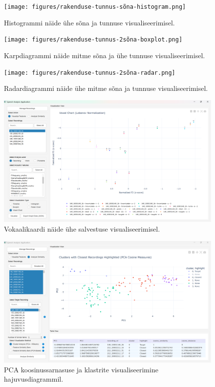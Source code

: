 \begin{figure}[H]
    \centering
    \texttt{[image: figures/rakenduse-tunnus-sõna-histogram.png]}
    \captionsetup{list=no}
    \caption{Histogrammi näide ühe sõna ja tunnuse visualiseerimisel.}
    \label{fig:rakenduse-tunnus-sõna-histogram}
\end{figure}
\begin{figure}[H]
    \centering
    \texttt{[image: figures/rakenduse-tunnus-2sõna-boxplot.png]}
    \captionsetup{list=no}
    \caption{Karpdiagrammi näide mitme sõna ja ühe tunnuse visualiseerimisel.}
    \label{fig:rakenduse-tunnus-sõna-boxplot}
\end{figure}
\begin{figure}[H]
    \centering
    \texttt{[image: figures/rakenduse-tunnus-2sõna-radar.png]}
    \captionsetup{list=no}
    \caption{Radardiagrammi näide ühe mitme sõna ja tunnuse visualiseerimisel.}
    \label{fig:rakenduse-tunnus-2sõna-radar}
\end{figure}
\begin{figure}[H]
    \centering
    \includegraphics[width=\textwidth]{figures/rakenduse-tunnus-salvestus-vowel}
    \captionsetup{list=no}
    \caption{Vokaalikaardi näide ühe salvestuse visualiseerimisel.}
    \label{fig:rakenduse-tunnus-salvestus-vowel}
\end{figure}

\begin{figure}[H]
    \centering
    \includegraphics[width=\textwidth]{figures/rakenduse-sarnasus-cluster-closest.png}
    \captionsetup{list=no}
    \caption{PCA koosinussarnasuse ja klastrite visualiseerimine hajuvusdiagrammil.}
    \label{fig:rakenduse-sarnasus-cluster-closest}
\end{figure}

